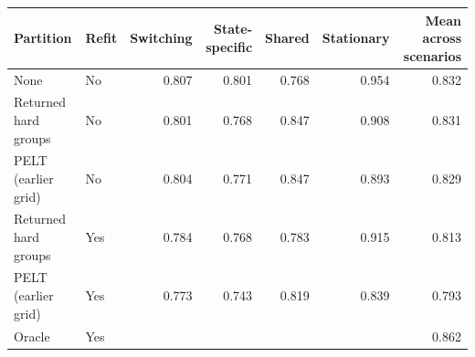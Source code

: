 \begin{tabular}{llrrrrr}
\toprule
Partition & Refit & Switching & State-specific & Shared & Stationary & Mean across scenarios \\
\midrule
None & No & 0.807 & 0.801 & 0.768 & 0.954 & 0.832 \\
\midrule
Returned hard groups & No & 0.801 & 0.768 & 0.847 & 0.908 & 0.831 \\
PELT (earlier grid) & No & 0.804 & 0.771 & 0.847 & 0.893 & 0.829 \\
Returned hard groups & Yes & 0.784 & 0.768 & 0.783 & 0.915 & 0.813 \\
PELT (earlier grid) & Yes & 0.773 & 0.743 & 0.819 & 0.839 & 0.793 \\
Oracle & Yes & \multicolumn{4}{c}{} & 0.862 \\
\bottomrule
\end{tabular}
